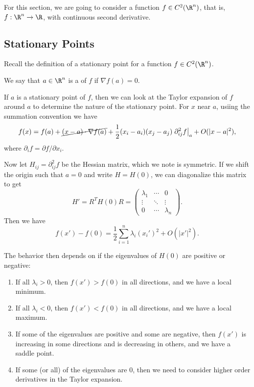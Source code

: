 \documentclass[a4paper]{scrartcl}
\begin{document}
For this section, we are going to consider a function $f \in C^2(\R^n)$, that is, $f: \R^n \rightarrow \R$, with continuous second derivative.

\subsection{Stationary Points}

Recall the definition of a stationary point for a function $f \in C^2(\R^n)$.

\begin{definition}
	We say that $a \in \R^n$ is a  of $f$ if
	$\nabla f(a)= 0$.
\end{definition}

If $a$ is a stationary point of $f$, then we can look at the Taylor expansion of $f$ around $a$ to determine the nature of the stationary point. For $x$ near $a$, usiing the summation convention we have
$$
f(x) = f(a) + \cancel{(x - a) \cdot \nabla f(a)} + \frac{1}{2}(x_i - a_i)(x_j - a_j) \left.\partial^2_{ij} f \right|_a + O(|x - a|^2),
$$
where $\partial_i f = \partial f/\partial x_i$.

Now let $H_{ij} = \partial^2_{ij} f$ be the Hessian matrix, which we note is symmetric. If we shift the origin such that $a = 0$ and write $H = H(0)$, we can diagonalize this matrix to get
$$
H' = R^T H(0) R = \begin{pmatrix}
	\lambda_1 & \cdots & 0 \\
	\vdots& \ddots &\vdots \\
	0 &\cdots & \lambda_n
\end{pmatrix}.
$$
Then we have
$$
	f(x') - f(0) = \frac{1}{2}\sum_{i = 1}^n \lambda_i (x_i')^2 + O(|x'|^2).
$$

The behavior then depends on if the eigenvalues of $H(0)$ are positive or negative:

\begin{enumerate}[label=(\roman*)]
	\item If all $\lambda_i > 0$, then $f(x') > f(0)$ in all directions, and we have a local minimum.
	\item If all $\lambda_i < 0$, then $f(x') < f(0)$ in all directions, and we have a local maximum.
	\item If some of the eigenvalues are positive and some are negative, then $f(x')$ is increasing in some directions and is decreasing in others, and we have a saddle point.
	\item If some (or all) of the eigenvalues are $0$, then we need to consider higher order derivatives in the Taylor expansion.
\end{enumerate}
\end{document}
